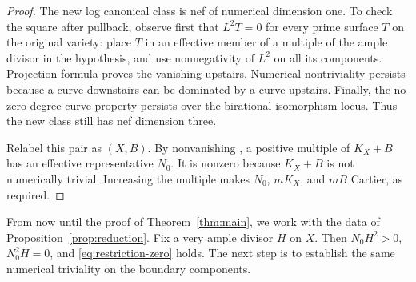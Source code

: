 \begin{proof}
The new log canonical class is nef of numerical dimension one. To check
the square after pullback, observe first that $L^2T=0$ for every prime
surface $T$ on the original variety: place $T$ in an effective member of
a multiple of the ample divisor in the hypothesis, and use nonnegativity
of $L^2$ on all its components. Projection formula proves the vanishing
upstairs. Numerical nontriviality persists because a curve downstairs
can be dominated by a curve upstairs. Finally, the no-zero-degree-curve
property persists over the birational isomorphism locus. Thus the new
class still has nef dimension three.

Relabel this pair as $(X,B)$. By nonvanishing
\cite[Theorem~1.4]{XuNonvanishing}, a positive multiple of $K_X+B$ has an
effective representative $N_0$. It is nonzero because $K_X+B$ is not
numerically trivial. Increasing the multiple makes $N_0$, $mK_X$, and
$mB$ Cartier, as required.
\end{proof}

From now until the proof of Theorem~\ref{thm:main}, we work with the
data of Proposition~\ref{prop:reduction}. Fix a very ample divisor $H$ on
$X$. Then $N_0H^2>0$, $N_0^2H=0$, and
\eqref{eq:restriction-zero} holds. The next step is to establish the same
numerical triviality on the boundary components.
